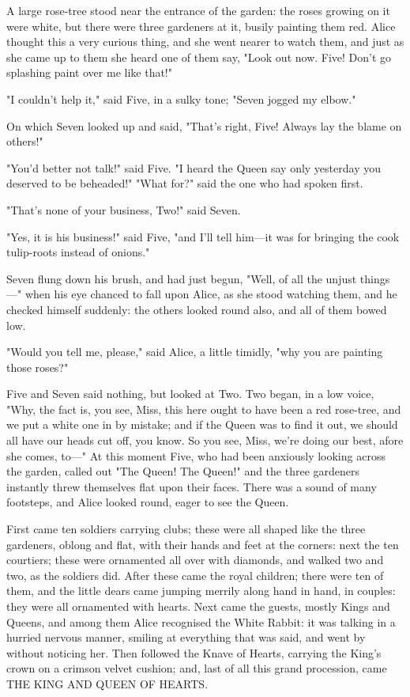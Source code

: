 A large rose-tree stood near the entrance of the garden: the roses growing on it were white, but there were three gardeners at it, busily painting them red. Alice thought this a very curious thing, and she went nearer to watch them, and just as she came up to them she heard one of them say, "Look out now. Five! Don't go splashing paint over me like that!"

"I couldn't help it," said Five, in a sulky tone; "Seven jogged my elbow."

On which Seven looked up and said, "That's right, Five! Always lay the blame on others!"

​"You'd better not talk!" said Five. "I heard the Queen say only yesterday you deserved to be beheaded!"
"What for?" said the one who had spoken first.

"That's none of your business, Two!" said Seven.

"Yes, it is his business!" said Five, "and I'll tell him—it was for bringing the cook tulip-roots instead of onions."

Seven flung down his brush, and had just begun, "Well, of all the unjust things—" when his eye chanced to fall upon Alice, as she stood watching them, and he checked himself suddenly: the others looked round also, and all of them bowed low.

​"Would you tell me, please," said Alice, a little timidly, "why you are painting those roses?"

Five and Seven said nothing, but looked at Two. Two began, in a low voice, "Why, the fact is, you see, Miss, this here ought to have been a red rose-tree, and we put a white one in by mistake; and if the Queen was to find it out, we should all have our heads cut off, you know. So you see, Miss, we're doing our best, afore she comes, to—" At this moment Five, who had been anxiously looking across the garden, called out "The Queen! The Queen!" and the three gardeners instantly threw themselves flat upon their faces. There was a sound of many footsteps, and Alice looked round, eager to see the Queen.

First came ten soldiers carrying clubs; these were all shaped like the three gardeners, oblong and flat, with their hands and feet at the corners: next the ten courtiers; these were ornamented all over with diamonds, and walked two and ​two, as the soldiers did. After these came the royal children; there were ten of them, and the little dears came jumping merrily along hand in hand, in couples: they were all ornamented with hearts. Next came the guests, mostly Kings and Queens, and among them Alice recognised the White Rabbit: it was talking in a hurried nervous manner, smiling at everything that was said, and went by without noticing her. Then followed the Knave of Hearts, carrying the King's crown on a crimson velvet cushion; and, last of all this grand procession, came THE KING AND QUEEN OF HEARTS.

